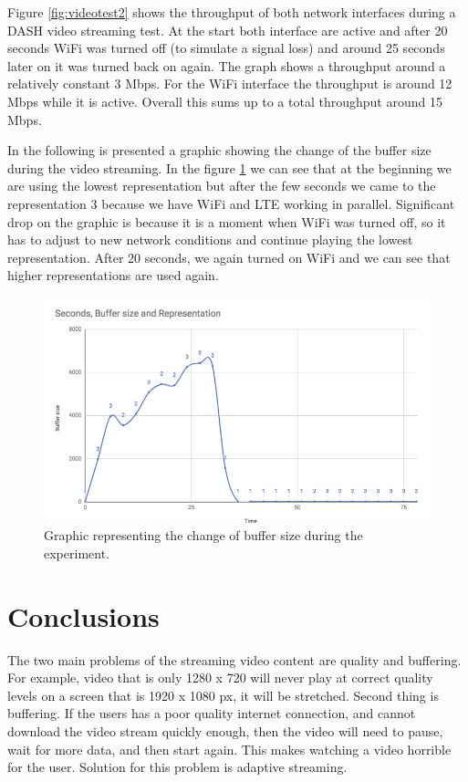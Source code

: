 \documentclass{llncs}
\begin{document}
Figure \ref{fig:videotest2} shows the throughput of both network interfaces during a DASH video streaming test. At the start both interface are active and after 20 seconds WiFi was turned off (to simulate a signal loss) and around 25 seconds later on it was turned back on again. The graph shows a throughput around a relatively constant 3 Mbps. For the WiFi interface the throughput is around 12 Mbps while it is active. Overall this sums up to a total throughput around 15 Mbps.

In the following is presented a graphic showing the change of the buffer size during the video streaming. In the figure \ref{fig:buffer2} we can see that at the beginning we are using the lowest representation but after the few seconds we came to the representation 3 because we have WiFi and LTE working in parallel. Significant drop on the graphic is because it is a moment when WiFi was turned off, so it has to adjust to new network conditions and continue playing the lowest representation. After 20 seconds, we again turned on WiFi and we can see that higher representations are used again. 

 
\begin{figure}[H]
\centering
\includegraphics[width=1.0\textwidth]{buffer-test-2.png}
\caption{\label{fig:buffer2} Graphic representing the change of buffer size during the experiment.}
\end{figure}


\section{Conclusions}
The two main problems of the streaming video content are quality and buffering. For example, video that is only 1280 x 720 will never play at correct quality levels on a screen that is 1920 x 1080 px, it will be stretched. Second thing is  buffering. If the users has a poor quality internet connection, and cannot download the video stream quickly enough, then the video will need to pause, wait for more data, and then start again. This makes watching a video horrible for the user. Solution for this problem is adaptive streaming. 
\end{document}

